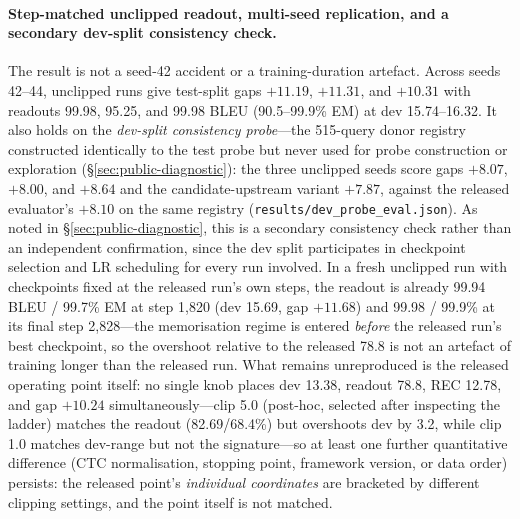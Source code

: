 \documentclass[pdflatex,sn-chicago]{sn-jnl}
\begin{document}
\paragraph{Step-matched unclipped readout, multi-seed replication, and a secondary dev-split consistency check.}
The result is not a seed-42 accident or a training-duration artefact. Across seeds 42--44, unclipped runs give test-split gaps $+11.19$, $+11.31$, and $+10.31$ with readouts 99.98, 95.25, and 99.98 BLEU (90.5--99.9\% EM) at dev 15.74--16.32. It also holds on the \emph{dev-split consistency probe}---the 515-query donor registry constructed identically to the test probe but never used for probe construction or exploration (\S\ref{sec:public-diagnostic}): the three unclipped seeds score gaps $+8.07$, $+8.00$, and $+8.64$ and the candidate-upstream variant $+7.87$, against the released evaluator's $+8.10$ on the same registry (\texttt{results/dev\_probe\_eval.json}). As noted in \S\ref{sec:public-diagnostic}, this is a secondary consistency check rather than an independent confirmation, since the dev split participates in checkpoint selection and LR scheduling for every run involved. In a fresh unclipped run with checkpoints fixed at the released run's own steps, the readout is already 99.94 BLEU / 99.7\% EM at step 1{,}820 (dev 15.69, gap $+11.68$) and 99.98 / 99.9\% at its final step 2{,}828---the memorisation regime is entered \emph{before} the released run's best checkpoint, so the overshoot relative to the released 78.8 is not an artefact of training longer than the released run. What remains unreproduced is the released operating point itself: no single knob places dev 13.38, readout 78.8, REC 12.78, and gap $+10.24$ simultaneously---clip 5.0 (post-hoc, selected after inspecting the ladder) matches the readout (82.69/68.4\%) but overshoots dev by 3.2, while clip 1.0 matches dev-range but not the signature---so at least one further quantitative difference (CTC normalisation, stopping point, framework version, or data order) persists: the released point's \emph{individual coordinates} are bracketed by different clipping settings, and the point itself is not matched.
\end{document}
